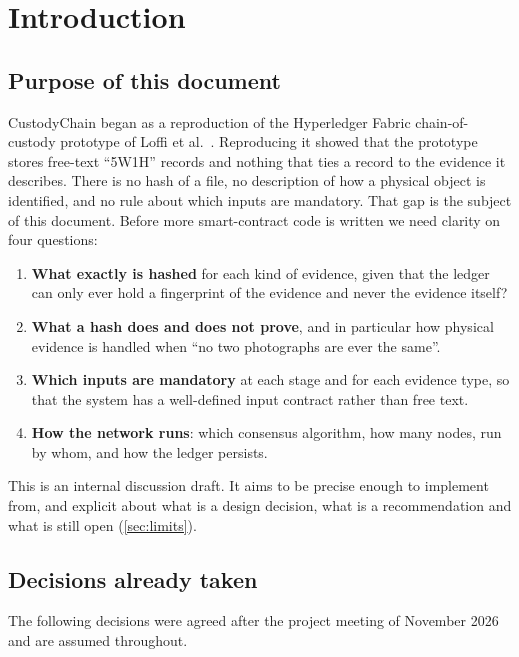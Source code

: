 \section{Introduction}
\label{sec:intro}

\subsection{Purpose of this document}
CustodyChain began as a reproduction of the Hyperledger Fabric chain-of-custody prototype of Loffi et al.~\cite{loffi2025}. Reproducing it showed that the prototype stores free-text \enquote{5W1H} records and nothing that ties a record to the evidence it describes. There is no hash of a file, no description of how a physical object is identified, and no rule about which inputs are mandatory. That gap is the subject of this document. Before more smart-contract code is written we need clarity on four questions:

\begin{enumerate}[label=\textbf{Q\arabic*}]
  \item \textbf{What exactly is hashed} for each kind of evidence, given that the ledger can only ever hold a fingerprint of the evidence and never the evidence itself?
  \item \textbf{What a hash does and does not prove}, and in particular how physical evidence is handled when \enquote{no two photographs are ever the same}.
  \item \textbf{Which inputs are mandatory} at each stage and for each evidence type, so that the system has a well-defined input contract rather than free text.
  \item \textbf{How the network runs}: which consensus algorithm, how many nodes, run by whom, and how the ledger persists.
\end{enumerate}

This is an internal discussion draft. It aims to be precise enough to implement from, and explicit about what is a design decision, what is a recommendation and what is still open (\cref{sec:limits}).

\subsection{Decisions already taken}
The following decisions were agreed after the project meeting of November 2026 and are assumed throughout.

